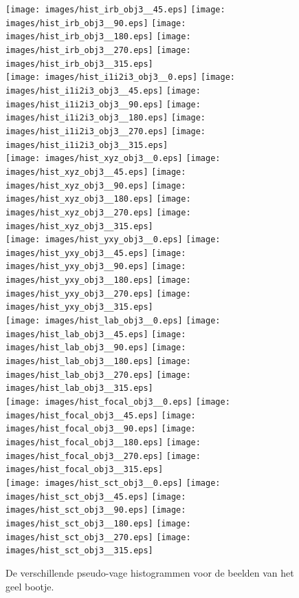 \begin{figure}[tbp]
\begin{center}
\texttt{[image: images/hist\_irb\_obj3\_\_45.eps]}
\texttt{[image: images/hist\_irb\_obj3\_\_90.eps]}
\texttt{[image: images/hist\_irb\_obj3\_\_180.eps]}
\texttt{[image: images/hist\_irb\_obj3\_\_270.eps]}
\texttt{[image: images/hist\_irb\_obj3\_\_315.eps]}\\[5pt]
\texttt{[image: images/hist\_i1i2i3\_obj3\_\_0.eps]}
\texttt{[image: images/hist\_i1i2i3\_obj3\_\_45.eps]}
\texttt{[image: images/hist\_i1i2i3\_obj3\_\_90.eps]}
\texttt{[image: images/hist\_i1i2i3\_obj3\_\_180.eps]}
\texttt{[image: images/hist\_i1i2i3\_obj3\_\_270.eps]}
\texttt{[image: images/hist\_i1i2i3\_obj3\_\_315.eps]}\\[5pt]
\texttt{[image: images/hist\_xyz\_obj3\_\_0.eps]}
\texttt{[image: images/hist\_xyz\_obj3\_\_45.eps]}
\texttt{[image: images/hist\_xyz\_obj3\_\_90.eps]}
\texttt{[image: images/hist\_xyz\_obj3\_\_180.eps]}
\texttt{[image: images/hist\_xyz\_obj3\_\_270.eps]}
\texttt{[image: images/hist\_xyz\_obj3\_\_315.eps]}\\[5pt]
\texttt{[image: images/hist\_yxy\_obj3\_\_0.eps]}
\texttt{[image: images/hist\_yxy\_obj3\_\_45.eps]}
\texttt{[image: images/hist\_yxy\_obj3\_\_90.eps]}
\texttt{[image: images/hist\_yxy\_obj3\_\_180.eps]}
\texttt{[image: images/hist\_yxy\_obj3\_\_270.eps]}
\texttt{[image: images/hist\_yxy\_obj3\_\_315.eps]}\\[5pt]
\texttt{[image: images/hist\_lab\_obj3\_\_0.eps]}
\texttt{[image: images/hist\_lab\_obj3\_\_45.eps]}
\texttt{[image: images/hist\_lab\_obj3\_\_90.eps]}
\texttt{[image: images/hist\_lab\_obj3\_\_180.eps]}
\texttt{[image: images/hist\_lab\_obj3\_\_270.eps]}
\texttt{[image: images/hist\_lab\_obj3\_\_315.eps]}\\
\texttt{[image: images/hist\_focal\_obj3\_\_0.eps]}
\texttt{[image: images/hist\_focal\_obj3\_\_45.eps]}
\texttt{[image: images/hist\_focal\_obj3\_\_90.eps]}
\texttt{[image: images/hist\_focal\_obj3\_\_180.eps]}
\texttt{[image: images/hist\_focal\_obj3\_\_270.eps]}
\texttt{[image: images/hist\_focal\_obj3\_\_315.eps]}\\[5pt]
\texttt{[image: images/hist\_sct\_obj3\_\_0.eps]}
\texttt{[image: images/hist\_sct\_obj3\_\_45.eps]}
\texttt{[image: images/hist\_sct\_obj3\_\_90.eps]}
\texttt{[image: images/hist\_sct\_obj3\_\_180.eps]}
\texttt{[image: images/hist\_sct\_obj3\_\_270.eps]}
\texttt{[image: images/hist\_sct\_obj3\_\_315.eps]}
\caption{\label{fig:alle_histn_geel_bootje}De verschillende pseudo-vage histogrammen voor de beelden 
van het geel bootje.}
\end{center}
\end{figure}


